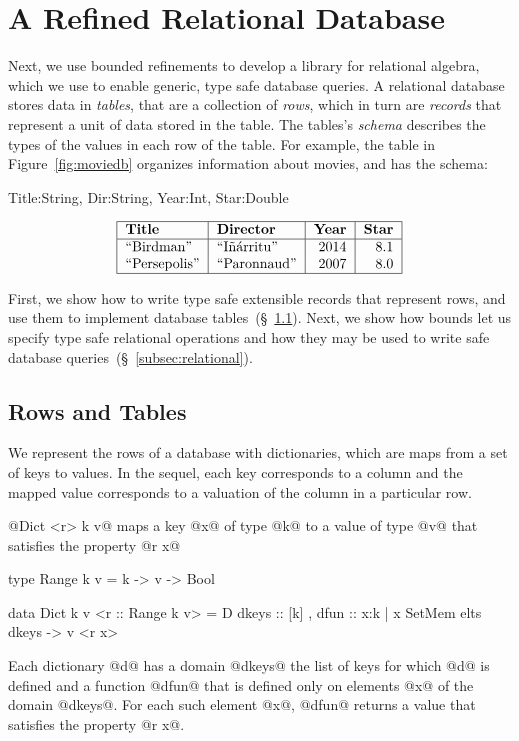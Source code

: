 \section{A Refined Relational Database}\label{sec:database}

Next, we use bounded refinements to develop a library
for relational algebra, which we use to enable generic,
type safe database queries.
%
A relational database stores data in \emph{tables},
that are a collection of \emph{rows}, which in turn 
are \emph{records} that represent a unit of data 
stored in the table.
The tables's \textit{schema} describes the types of 
the values in each row of the table.
For example, the table in Figure~\ref{fig:moviedb} organizes 
information about movies, and has the schema:
%
\begin{code}
 Title:String, Dir:String, Year:Int, Star:Double
\end{code}

\begin{table}[h]
\centering
\captionsetup{justification=centering}
$$
\begin{tabular}{| l | l| r | r |}
  \hline
  \textbf{Title} & \textbf{Director} & \textbf{Year} & \textbf{Star} \\
  \hline  
  ``Birdman'' & ``I\~{n}\'{a}rritu''   & 2014 & 8.1\\
  ``Persepolis''  & ``Paronnaud'' & 2007 & 8.0 \\ 
  \hline
\end{tabular}
$$
\caption{Example entries for Movies Database.}
\label{fig:moviedb} 
\end{table}

First, we show how to write type safe extensible 
records  that represent rows, and use them to 
implement database tables~(\S~\ref{subsec:records}). 
%
Next, we show how bounds let us specify type 
safe relational operations and how they may be 
used to write safe database queries~(\S~\ref{subsec:relational}).

\subsection{Rows and Tables}\label{subsec:records}

We represent the rows of a database with dictionaries, 
which are maps from a set of keys to values.
In the sequel, each key corresponds to a column and 
the mapped value corresponds to a valuation of the column 
in a particular row.

 @Dict <r> k v@ maps a key @x@ of 
type @k@ to a value of type @v@ that satisfies the property @r x@
%
\begin{code}
  type Range k v = k -> v -> Bool
   
  data Dict k v <r :: Range k v> = D {
      dkeys :: [k]
    , dfun  :: x:{k | x SetMem elts dkeys} -> v <r x>
    }
\end{code}      
%
Each dictionary @d@ has a domain @dkeys@ 
\ie the list of keys for which @d@ is defined 
and a function @dfun@ that is defined only on
elements @x@ of the domain @dkeys@.
%
For each such element @x@, @dfun@ returns a value that satisfies the
property @r x@.

